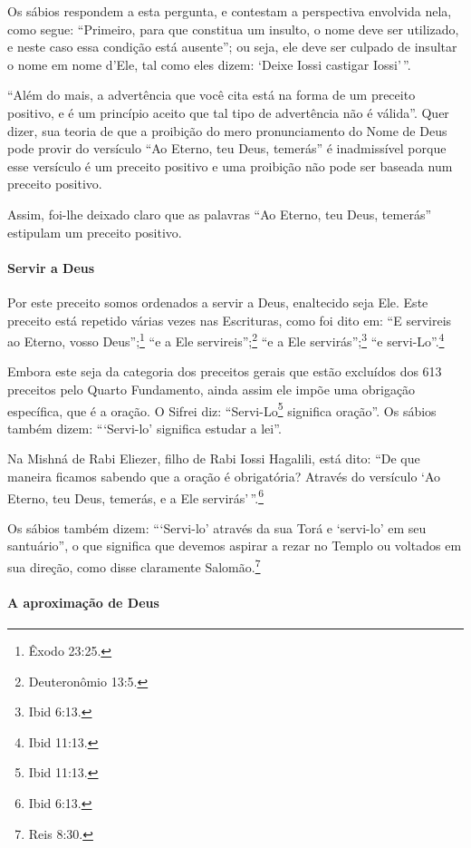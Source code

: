 Os sábios respondem a esta pergunta, e contestam a perspectiva envolvida
nela, como segue: ``Primeiro, para que constitua um insulto, o nome deve
ser utilizado, e neste caso essa condição está ausente''; ou seja, ele
deve ser culpado de insultar o nome em nome d'Ele, tal como eles dizem:
`Deixe Iossi castigar Iossi'\,''.

``Além do mais, a advertência que você cita está na forma de um preceito
positivo, e é um princípio aceito que tal tipo de advertência não é
válida''. Quer dizer, sua teoria de que a proibição do mero
pronunciamento do Nome de Deus pode provir do versículo ``Ao Eterno, teu
Deus, temerás'' é inadmissível porque esse versículo é um preceito
positivo e uma proibição não pode ser baseada num preceito positivo.

Assim, foi-lhe deixado claro que as palavras ``Ao Eterno, teu Deus,
temerás'' estipulam um preceito positivo.

\paragraph{Servir a Deus}

Por este preceito somos ordenados a servir a Deus, enaltecido seja Ele.
Este preceito está repetido várias vezes nas Escrituras, como foi dito
em: ``E servireis ao Eterno, vosso Deus'';\footnote{Êxodo 23:25.} ``e a Ele
servireis'';\footnote{Deuteronômio 13:5.} ``e a Ele servirás'';\footnote{Ibid 6:13.} ``e servi-Lo''.\footnote{Ibid 11:13.}

Embora este seja da categoria dos preceitos gerais que estão excluídos dos 613 preceitos pelo Quarto Fundamento, ainda assim ele impõe uma obrigação
específica, que é a oração. O Sifrei diz: ``Servi-Lo\footnote{Ibid 11:13.}
significa oração''. Os sábios também dizem: ```Servi-lo' significa
estudar a lei''.

Na Mishná de Rabi Eliezer, filho de Rabi Iossi Hagalili, está dito:
``De que maneira ficamos sabendo que a oração é obrigatória? Através do
versículo `Ao Eterno, teu Deus, temerás, e a Ele servirás'\,''.\footnote{Ibid
6:13.}

Os sábios também dizem: ```Servi-lo' através da sua Torá e
`servi-lo' em seu santuário'', o que significa que devemos aspirar a
rezar no Templo ou voltados em sua direção, como disse claramente
Salomão.\footnote{Reis 8:30.}

\paragraph{A aproximação de Deus}

